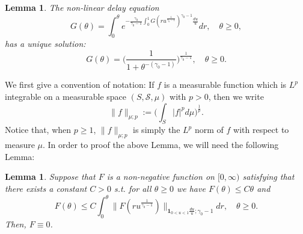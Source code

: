 \documentclass[12pt, a4paper]{amsart}
\newtheorem{lem}[thm]{Lemma}
\theoremstyle{definition}
\numberwithin{equation}{section}
\begin{document}
\begin{lem}
\label{lem: characterize the general Mittag-Leffler distribution}
	The non-linear delay equation
\[\label{eq: equation for the distribution}
	G( \theta) 
	= \int_0^\theta e^{ - \frac{\gamma_0} {\gamma_0 - 1} \int_0^1 G(ru^{\frac{1}{\gamma_0 - 1} })^{\gamma_0 - 1}\frac{du}{u} } dr,
	\quad \theta \geq 0,
\]
	has a unique solution:
\[\label{eq: solution for the equation}
	G(\theta) 
	= \big(\frac{1}{1+\theta^{-(\gamma_0 - 1)}}\big)^{\frac{1}{\gamma_0 - 1}}, 
	\quad \theta \geq 0.
\]
\end{lem}

	We first give a convention of notation:
	If $f$ is a measurable function which is $L^p$ integrable on a measurable space $(S,\mathscr S,\mu)$ with $p > 0$, then we write 
\[
	\|f\|_{\mu;p} := \Big(\int_{S} |f|^p d\mu \Big)^{\frac{1}{p}}.
\]
	Notice that, when $p\geq 1$, $\|f\|_{\mu;p}$ is simply the $L^p$ norm of $f$ with respect to measure $\mu$.	
	In order to proof the above Lemma, we will need the following Lemma:

\begin{lem}\label{lem: F is zero}
	Suppose that $F$ is a non-negative function on $[0,\infty)$ satisfying that there exists a constant $C>0$ s.t. for all $\theta \geq 0$ we have $F(\theta) \leq C\theta$ and 
\[
	F(\theta)
	\leq C \int_0^\theta \|  F(ru^{ \frac{1}{\gamma_0- 1}  })\|_{\mathbf 1_{0<u<1}\frac{du}{u}; \gamma_0 - 1} dr, \quad \theta \geq 0.
\]
	Then, $F \equiv 0$.
\end{lem}
	
\end{document}
